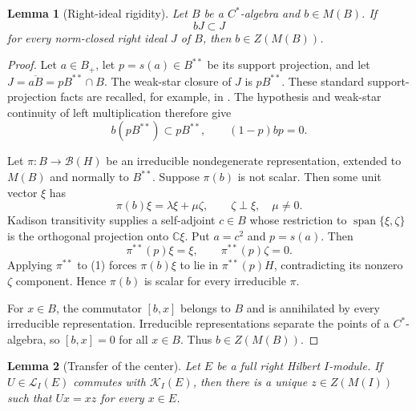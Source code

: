 \documentclass[11pt]{article}
\newtheorem{lemma}{Lemma}
\newcommand{\Kcomp}{\mathcal K}
\newcommand{\Ladj}{\mathcal L}
\newcommand{\spn}{\operatorname{span}}
\begin{document}
\begin{lemma}[Right-ideal rigidity]\label{lem:rightideal}
Let $B$ be a $C^*$-algebra and $b\in M(B)$.  If
\[
                    bJ\subset J
\]
for every norm-closed right ideal $J$ of $B$, then $b\in Z(M(B))$.
\end{lemma}

\begin{proof}
Let $a\in B_+$, let $p=s(a)\in B^{**}$ be its support projection, and let
$J=\overline{aB}=pB^{**}\cap B$.  The weak-star closure of $J$ is $pB^{**}$.
These standard support-projection facts are recalled, for example, in
\cite{Pedersen}.  The hypothesis and weak-star continuity of left
multiplication therefore give
\[
                 b(pB^{**})\subset pB^{**},
                 \qquad (1-p)bp=0.                 \tag{1}
\]

Let $\pi:B\to\mathcal B(H)$ be an irreducible nondegenerate representation,
extended to $M(B)$ and normally to $B^{**}$.  Suppose $\pi(b)$ is not scalar.
Then some unit vector $\xi$ has
\[
 \pi(b)\xi=\lambda\xi+\mu\zeta,
 \qquad \zeta\perp\xi,\quad \mu\ne0.
\]
Kadison transitivity \cite{KadisonRingrose} supplies a self-adjoint $c\in B$
whose restriction to
$\spn\{\xi,\zeta\}$ is the orthogonal projection onto $\mathbb C\xi$.
Put $a=c^2$ and $p=s(a)$.  Then
\[
 \pi^{**}(p)\xi=\xi,\qquad \pi^{**}(p)\zeta=0.
\]
Applying $\pi^{**}$ to (1) forces $\pi(b)\xi$ to lie in
$\pi^{**}(p)H$, contradicting its nonzero $\zeta$ component.  Hence
$\pi(b)$ is scalar for every irreducible $\pi$.

For $x\in B$, the commutator $[b,x]$ belongs to $B$ and is annihilated by
every irreducible representation.  Irreducible representations separate the
points of a $C^*$-algebra, so $[b,x]=0$ for all $x\in B$.  Thus
$b\in Z(M(B))$.
\end{proof}

\begin{lemma}[Transfer of the center]\label{lem:centertransfer}
Let $E$ be a full right Hilbert $I$-module.  If
$U\in\Ladj_I(E)$ commutes with $\Kcomp_I(E)$, then there is a unique
$z\in Z(M(I))$ such that $Ux=xz$ for every $x\in E$.
\end{lemma}
\end{document}
